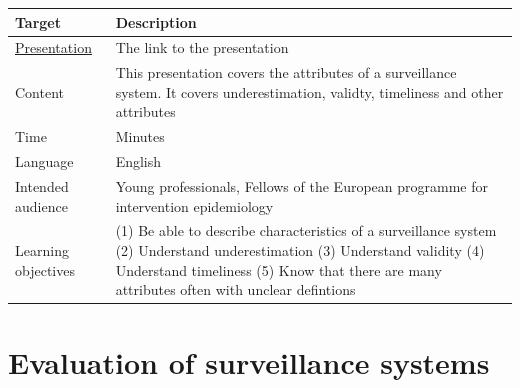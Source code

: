 \documentclass[
  letterpaper,
  DIV=11,
  numbers=noendperiod]{scrreprt}
\begin{document}
\begin{longtable}[]{@{}
  >{\raggedright\arraybackslash}p{}
  >{\raggedright\arraybackslash}p{}@{}}
\toprule\noalign{}
\begin{minipage}[b]{\linewidth}\raggedright
Target
\end{minipage} & \begin{minipage}[b]{\linewidth}\raggedright
Description
\end{minipage} \\
\midrule\noalign{}
\endhead
\bottomrule\noalign{}
\endlastfoot
\href{1_Presentations/presentation_attributes.html}{Presentation} & The
link to the presentation \\
Content & This presentation covers the attributes of a surveillance
system. It covers underestimation, validty, timeliness and other
attributes \\
Time & 20 Minutes \\
Language & English \\
Intended audience & Young professionals, Fellows of the European
programme for intervention epidemiology \\
Learning objectives & (1) Be able to describe characteristics of a
surveillance system (2) Understand underestimation (3) Understand
validity (4) Understand timeliness (5) Know that there are many
attributes often with unclear defintions \\
\end{longtable}

\section*{Evaluation of surveillance
systems}\label{evaluation-of-surveillance-systems}

\end{document}
